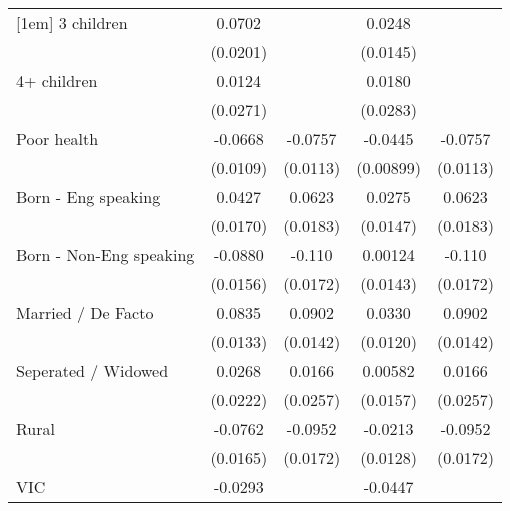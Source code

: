 {\begin{tabular}{l*{4}{c}}
[1em]
3 children          &      0.0702\sym{***}&                     &      0.0248         &                     \\
                    &    (0.0201)         &                     &    (0.0145)         &                     \\
[1em]
4+ children         &      0.0124         &                     &      0.0180         &                     \\
                    &    (0.0271)         &                     &    (0.0283)         &                     \\
[1em]
Poor health         &     -0.0668\sym{***}&     -0.0757\sym{***}&     -0.0445\sym{***}&     -0.0757\sym{***}\\
                    &    (0.0109)         &    (0.0113)         &   (0.00899)         &    (0.0113)         \\
[1em]
Born - Eng speaking &      0.0427\sym{*}  &      0.0623\sym{***}&      0.0275         &      0.0623\sym{***}\\
                    &    (0.0170)         &    (0.0183)         &    (0.0147)         &    (0.0183)         \\
[1em]
Born - Non-Eng speaking&     -0.0880\sym{***}&      -0.110\sym{***}&     0.00124         &      -0.110\sym{***}\\
                    &    (0.0156)         &    (0.0172)         &    (0.0143)         &    (0.0172)         \\
[1em]
Married / De Facto  &      0.0835\sym{***}&      0.0902\sym{***}&      0.0330\sym{**} &      0.0902\sym{***}\\
                    &    (0.0133)         &    (0.0142)         &    (0.0120)         &    (0.0142)         \\
[1em]
Seperated / Widowed &      0.0268         &      0.0166         &     0.00582         &      0.0166         \\
                    &    (0.0222)         &    (0.0257)         &    (0.0157)         &    (0.0257)         \\
[1em]
Rural               &     -0.0762\sym{***}&     -0.0952\sym{***}&     -0.0213         &     -0.0952\sym{***}\\
                    &    (0.0165)         &    (0.0172)         &    (0.0128)         &    (0.0172)         \\
[1em]
VIC                 &     -0.0293\sym{*}  &                     &     -0.0447\sym{***}&                     \\

\end{tabular}}
